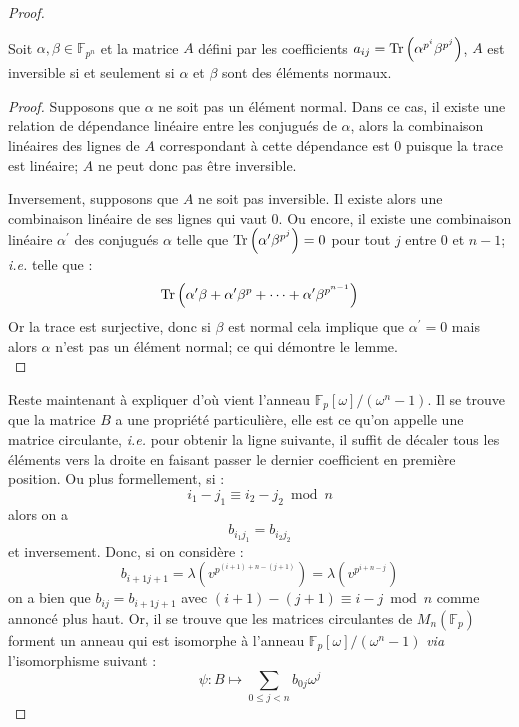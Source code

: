 \documentclass[a4paper]{article} %
\numberwithin{equation}{section}
\newcommand\GF[1]{\mathbb{F}_{#1}}
\newcommand\Tr[1]{\textup{Tr}\left(#1\right)}
\begin{document}
\begin{proof}
\begin{lem}%
Soit $\alpha,\beta\in\GF{p^n}$ et la matrice $A$ défini par les coefficients $a_{ij} = \Tr{\alpha^{p^i}\beta^{p^j}}$, $A$ est inversible si et seulement si $\alpha$ et $\beta$ sont des éléments normaux.
\end{lem}
\begin{proof}
Supposons que $\alpha$ ne soit pas un élément normal. Dans ce cas, il existe une relation de dépendance linéaire entre les conjugués de $\alpha$, alors la combinaison linéaires des lignes de $A$ correspondant à cette dépendance est $0$ puisque la trace est linéaire; $A$ ne peut donc pas être inversible.\par
Inversement, supposons que $A$ ne soit pas inversible. Il existe alors une combinaison linéaire de ses lignes qui vaut $0$. Ou encore, il existe une combinaison linéaire $\alpha^{\prime}$ des conjugués $\alpha$ telle que $\Tr{\alpha^{\prime}\beta^{p^j}} = 0$ pour tout $j$ entre $0$ et $n-1$; \textit{i.e.} telle que :
\[\Tr{\alpha^{\prime}\beta + \alpha^{\prime}\beta^p + \dots + \alpha^{\prime}\beta^{p^{n-1}}}\]
Or la trace est surjective,%
donc si $\beta$ est normal cela implique que $\alpha^{\prime} = 0$ mais alors $\alpha$ n'est pas un élément normal; ce qui démontre le lemme.\\
\end{proof}
Reste maintenant à expliquer d'où vient l'anneau $\mathbb{F}_p[\omega]/(\omega^n - 1)$. Il se trouve que la matrice $B$ a une propriété particulière, elle est ce qu'on appelle une matrice circulante, \textit{i.e.} pour obtenir la ligne suivante, il suffit de décaler tous les éléments vers la droite en faisant passer le dernier coefficient en première position. Ou plus formellement, si :
\[i_1 - j_1 \equiv i_2 - j_2 \bmod n\]
alors on a 
\[b_{i_1j_1} = b_{i_2j_2}\]
et inversement. Donc, si on considère :
\[b_{i+1j+1} = \lambda\left(v^{p^{(i+1) + n - (j+1)}}\right) = \lambda\left(v^{p^{i+n-j}}\right)\]
on a bien que $b_{ij} = b_{i+1j+1}$ avec $(i+1) - (j+1) \equiv i - j \bmod n$ comme annoncé plus haut. Or, il se trouve que les matrices circulantes de $M_n(\GF{p})$ forment un anneau qui est isomorphe à l'anneau $\mathbb{F}_p[\omega]/(\omega^n - 1)$ \textit{via} l'isomorphisme suivant :
\begin{equation*}
\label{isomconvert}
\psi : B \longmapsto \sum_{0\leq j < n}{b_{0j}\omega^j}
\end{equation*}\par

\end{proof}
\end{document}
